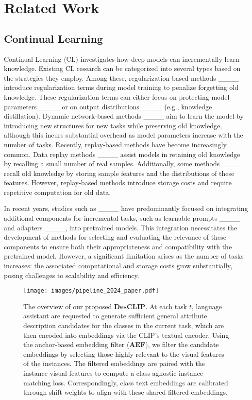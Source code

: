 \section{Related Work}
\label{sec:Related Work}

\subsection{Continual Learning}
\label{sec:Continual Learning}

Continual Learning (CL) investigates how deep models can incrementally learn knowledge. Existing CL research can be categorized into several types based on the strategies they employ. Among these, regularization-based methods ____ introduce regularization terms during model training to penalize forgetting old knowledge. These regularization terms can either focus on protecting model parameters ____ or on output distributions ____ (e.g., knowledge distillation). Dynamic network-based methods ____ aim to learn the model by introducing new structures for new tasks while preserving old knowledge, although this incurs substantial overhead as model parameters increase with the number of tasks. Recently, replay-based methods have become increasingly common. Data replay methods ____ assist models in retaining old knowledge by recalling a small number of real samples. Additionally, some methods ____ recall old knowledge by storing sample features and the distributions of these features. However, replay-based methods introduce storage costs and require repetitive computation for old data.

In recent years, studies such as ____ have predominantly focused on integrating additional components for incremental tasks, such as learnable prompts ____ and adapters ____, into pretrained models. This integration necessitates the development of methods for selecting and evaluating the relevance of these components to ensure both their appropriateness and compatibility with the pretrained model. However, a significant limitation arises as the number of tasks increases: the associated computational and storage costs grow substantially, posing challenges to scalability and efficiency.

\begin{figure*}[htbp]
  \centering
  \texttt{[image: images/pipeline\_2024\_paper.pdf]}
   \vspace{-5em}
  \caption{The overview of our proposed \textbf{DesCLIP}. At each task $t$, language assistant are requested to generate sufficient general attribute description candidates for the classes in the current task, which are then encoded into embeddings via the CLIP's textual encoder. Using the anchor-based embedding filter (\textbf{AEF}), we filter the candidate embeddings by selecting those highly relevant to the visual features of the instances. The filtered embeddings are paired with the instance visual features to compute a class-agnostic instance matching loss. Correspondingly, class text embeddings are calibrated through shift weights to align with these shared filtered embeddings.}
  \label{fig:pipeline}
\end{figure*}

